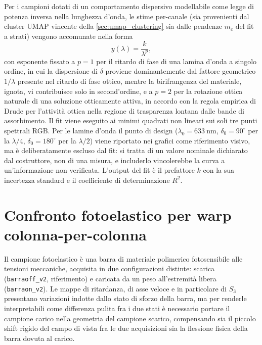 Per i campioni dotati di un comportamento dispersivo modellabile come legge di potenza inversa nella lunghezza d'onda, le stime per-canale (sia provenienti dal cluster UMAP vincente della \cref{sec:umap_clustering} sia dalle pendenze $m_c$ del fit a strati) vengono accomunate nella forma
\begin{equation}
    y(\lambda) = \frac{k}{\lambda^p},
    \label{eq:fit_dispersione}
\end{equation}
con esponente fissato a $p = 1$ per il ritardo di fase di una lamina d'onda a singolo ordine, in cui la dispersione di $\delta$ proviene dominantemente dal fattore geometrico $1/\lambda$ presente nel ritardo di fase ottico, mentre la birifrangenza del materiale, ignota, vi contribuisce solo in second'ordine, e a $p = 2$ per la rotazione ottica naturale di una soluzione otticamente attiva, in accordo con la regola empirica di Drude per l'attività ottica nella regione di trasparenza lontana dalle bande di assorbimento. Il fit viene eseguito ai minimi quadrati non lineari sui soli tre punti spettrali RGB. Per le lamine d'onda il punto di design ($\lambda_0 = \SI{633}{\nano\meter}$, $\delta_0 = 90^\circ$ per la $\lambda/4$, $\delta_0 = 180^\circ$ per la $\lambda/2$) viene riportato nei grafici come riferimento visivo, ma è deliberatamente escluso dal fit: si tratta di un valore nominale dichiarato dal costruttore, non di una misura, e includerlo vincolerebbe la curva a un'informazione non verificata. L'output del fit è il prefattore $k$ con la sua incertezza standard e il coefficiente di determinazione $R^2$.

\section{Confronto fotoelastico per warp colonna-per-colonna}
\label{sec:fotoelasticita}

Il campione fotoelastico è una barra di materiale polimerico fotosensibile alle tensioni meccaniche, acquisita in due configurazioni distinte: scarica (\texttt{barraoff\_v2}, riferimento) e caricata da un peso all'estremità libera (\texttt{barraon\_v2}). Le mappe di ritardanza, di asse veloce e in particolare di $S_3$ presentano variazioni indotte dallo stato di sforzo della barra, ma per renderle interpretabili come differenza pulita fra i due stati è necessario portare il campione carico nella geometria del campione scarico, compensando sia il piccolo shift rigido del campo di vista fra le due acquisizioni sia la flessione fisica della barra dovuta al carico.

